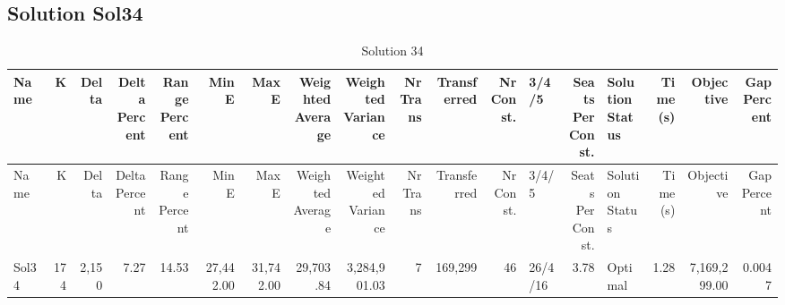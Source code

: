 \documentclass[a4paper]{article}
\begin{document}
\clearpage
\subsection{Solution Sol34}

{\scriptsize
\begin{longtable}{lrrrrrrrrrrrlrlrrr}
\caption{Solution 34}
\\ \toprule
Name &K &Delta &\shortstack{Delta\\Percent} &\shortstack{Range\\Percent} &Min E &Max E &\shortstack{Weighted\\Average} &\shortstack{Weighted\\Variance} &\shortstack{Nr\\Trans} &Transferred &\shortstack{Nr\\Const.} &3/4/5 &\shortstack{Seats\\Per\\Const.} &\shortstack{Solution\\Status} &\shortstack{Time\\(s)} &Objective &\shortstack{Gap\\Percent} \\ \midrule
\endfirsthead
\toprule
Name &K &Delta &\shortstack{Delta\\Percent} &\shortstack{Range\\Percent} &Min E &Max E &\shortstack{Weighted\\Average} &\shortstack{Weighted\\Variance} &\shortstack{Nr\\Trans} &Transferred &\shortstack{Nr\\Const.} &3/4/5 &\shortstack{Seats\\Per\\Const.} &\shortstack{Solution\\Status} &\shortstack{Time\\(s)} &Objective &\shortstack{Gap\\Percent} \\ \midrule
\endhead
\bottomrule
\endfoot
Sol34&174&2,150& 7.27&14.53&27,442.00&31,742.00&29,703.84&3,284,901.03&7&169,299&46&26/4/16& 3.78&Optimal& 1.28&7,169,299.00&0.0047\\ 
\end{longtable}

}
\end{document}
